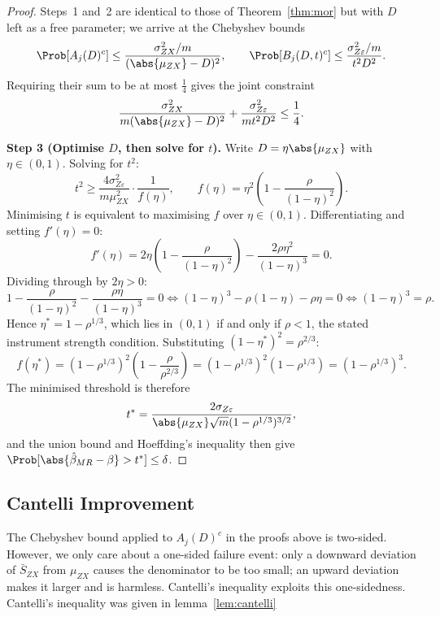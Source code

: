 \begin{proof}
    Steps~1 and~2 are identical to those of Theorem~\ref{thm:mor} but with $D$ left as a free parameter; we arrive at the Chebyshev bounds
    \[
        \Prob[A_j(D)^c] \leq \frac{\sigma_{ZX}^2/m}{(\abs{\mu_{ZX}}-D)^2}, \qquad \Prob[B_j(D,t)^c] \leq \frac{\sigma_{Z\varepsilon}^2/m}{t^2 D^2}.
    \]
    Requiring their sum to be at most $\frac{1}{4}$ gives the joint constraint
    \begin{equation}
    \label{eq:mor_opt_constraint}
        \frac{\sigma_{ZX}^2}{m(\abs{\mu_{ZX}}-D)^2} + \frac{\sigma_{Z\varepsilon}^2}{m t^2 D^2} \leq \frac{1}{4}.
    \end{equation}

    \medskip\noindent\textbf{Step 3 (Optimise $D$, then solve for $t$).}
    Write $D = \eta\abs{\mu_{ZX}}$ with $\eta\in(0,1)$. 
    Solving for $t^2$:
    \[
        t^2 \geq
        \frac{4\sigma_{Z\varepsilon}^2}{m\mu_{ZX}^2}
        \cdot \frac{1}{f(\eta)},
        \qquad
        f(\eta) = \eta^2\!\left(1 - \frac{\rho}{(1-\eta)^2}\right).
    \]
    Minimising $t$ is equivalent to maximising $f$ over $\eta\in(0,1)$. Differentiating and setting $f'(\eta)=0$:
    \[
        f'(\eta) = 2\eta\!\left(1 - \frac{\rho}{(1-\eta)^2}\right) - \frac{2\rho\eta^2}{(1-\eta)^3} = 0.
    \]
    Dividing through by $2\eta > 0$:
    \[
        1 - \frac{\rho}{(1-\eta)^2} - \frac{\rho\eta}{(1-\eta)^3} = 0 \iff (1-\eta)^3 - \rho(1-\eta) - \rho\eta = 0 \iff (1-\eta)^3 = \rho.
    \]
    Hence $\eta^* = 1 - \rho^{1/3}$, which lies in $(0,1)$ if and only if $\rho < 1$, the stated instrument strength condition. Substituting $(1-\eta^*)^2 = \rho^{2/3}$:
    \[
        f(\eta^*) = (1-\rho^{1/3})^2\!\left(1 - \frac{\rho}{\rho^{2/3}}\right) = (1-\rho^{1/3})^2(1 - \rho^{1/3}) = (1-\rho^{1/3})^3.
    \]
    The minimised threshold is therefore
    \[
        t^* = \frac{2\sigma_{Z\varepsilon}}{\abs{\mu_{ZX}}\sqrt{m}(1-\rho^{1/3})^{3/2}},
    \]
    and the union bound and Hoeffding's inequality then give $\Prob[\abs{\hat\beta_{MR}-\beta}>t^*]\leq\delta$.
\end{proof}

\subsection{Cantelli Improvement}
\label{sec:mor_cantelli}

The Chebyshev bound applied to $A_j(D)^c$ in the proofs above is two-sided. However, we only care about a one-sided failure event: only a downward deviation of $\bar{S}_{ZX}$ from $\mu_{ZX}$ causes the denominator to be too small; an upward deviation makes it larger and is harmless. Cantelli's inequality exploits this one-sidedness. Cantelli's inequality was given in lemma~\ref{lem:cantelli}


